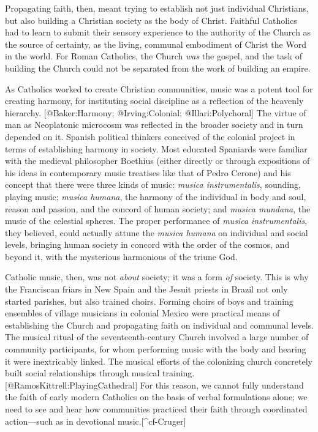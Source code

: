 Propagating faith, then, meant trying to establish not just individual Christians, but also building a Christian society as the body of Christ.
Faithful Catholics had to learn to submit their sensory experience to the authority of the Church as the source of certainty, as the living, communal embodiment of Christ the Word in the world.
For Roman Catholics, the Church \emph{was} the gospel, and the task of building the Church could not be separated from the work of building an empire.

As Catholics worked to create Christian communities, music was a potent tool for creating harmony, for instituting social discipline as a reflection of the heavenly hierarchy.
[@Baker:Harmony; @Irving:Colonial; @Illari:Polychoral]
The virtue of man as Neoplatonic microcosm was reflected in the broader society and in turn depended on it.
Spanish political thinkers conceived of the colonial project in terms of establishing harmony in society.
\Autocite[22--31]{Baker:Harmony}  Most educated Spaniards were familiar with the medieval philosopher Boethius (either directly or through expositions of his ideas in contemporary music treatises like that of Pedro Cerone) and his concept that there were three kinds of music: \emph{musica instrumentalis}, sounding, playing music; \emph{musica humana}, the harmony of the individual in body and soul, reason and passion, and the concord of human society; and \emph{musica mundana}, the music of the celestial spheres.
\Autocite[bk. 2, pp. 187--189; @Cerone:Melopeo, 203--208]{Boethius:Musica}
The proper performance of \emph{musica instrumentalis}, they believed, could actually attune the \emph{musica humana} on individual and social levels, bringing human society in concord with the order of the cosmos, and beyond it, with the mysterious harmonious of the triune God.

Catholic music, then, was not \emph{about} society; it was a form \emph{of} society.
This is why the Franciscan friars in New Spain and the Jesuit priests in Brazil not only started parishes, but also trained choirs.
Forming choirs of boys and training ensembles of village musicians in colonial Mexico were practical means of establishing the Church and propagating faith on individual and communal levels.
The musical ritual of the seventeenth-century Church involved a large number of community participants, for whom performing music with the body and hearing it were inextricably linked.
The musical efforts of the colonizing church concretely built social relationships through musical training.
[@RamosKittrell:PlayingCathedral]
For this reason, we cannot fully understand the faith of early modern Catholics on the basis of verbal formulations alone; we need to see and hear how communities practiced their faith through coordinated action---such as in devotional music.[^cf-Cruger]

